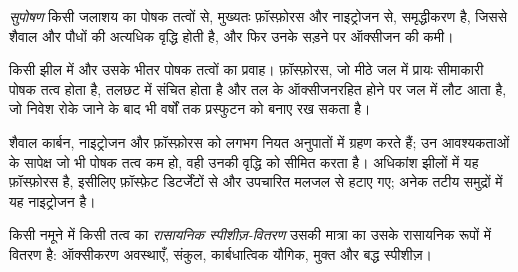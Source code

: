 \begin{definition}[सुपोषण]\label{def:b3:environmental-toxicology:eutrophication}
\emph{सुपोषण} किसी जलाशय का पोषक तत्वों से, मुख्यतः
फ़ॉस्फ़ोरस और नाइट्रोजन से, समृद्धीकरण है, जिससे शैवाल और पौधों की अत्यधिक वृद्धि होती है,
और फिर उनके सड़ने पर ऑक्सीजन की कमी।
\end{definition}

\begin{omfigure}

{\small किसी झील में और उसके भीतर पोषक तत्वों का प्रवाह। फ़ॉस्फ़ोरस, जो मीठे जल में प्रायः सीमाकारी
पोषक तत्व होता है, तलछट में संचित होता है और तल के ऑक्सीजनरहित होने पर जल में लौट आता है,
जो निवेश रोके जाने के बाद भी वर्षों तक प्रस्फुटन को बनाए रख सकता है।}
\end{omfigure}

शैवाल कार्बन, नाइट्रोजन और फ़ॉस्फ़ोरस को लगभग नियत अनुपातों में ग्रहण करते हैं;
उन आवश्यकताओं के सापेक्ष जो भी पोषक तत्व कम हो, वही उनकी वृद्धि को सीमित करता है। अधिकांश
झीलों में यह फ़ॉस्फ़ोरस है, इसीलिए फ़ॉस्फ़ेट डिटर्जेंटों से और
उपचारित मलजल से हटाए गए; अनेक तटीय समुद्रों में यह नाइट्रोजन है।

\begin{definition}[स्पीशीज़-वितरण]\label{def:b3:environmental-toxicology:speciation}
किसी नमूने में किसी तत्व का \emph{रासायनिक स्पीशीज़-वितरण}
उसकी मात्रा का उसके रासायनिक रूपों में वितरण है: ऑक्सीकरण
अवस्थाएँ, संकुल, कार्बधात्विक यौगिक, मुक्त और बद्ध स्पीशीज़।
\end{definition}

